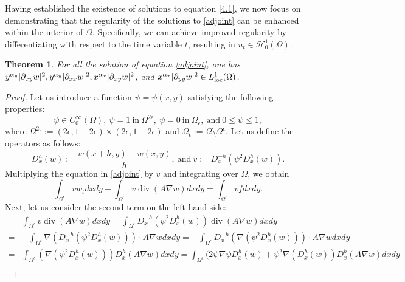 \documentclass[9pt,reqno]{amsart}
\newtheorem{theorem}{Theorem}
\theoremstyle{plain}
\numberwithin{equation}{section}
\numberwithin{theorem}{section}
\def\Om{\Omega}
\DeclareMathOperator*{\Div}{\mathrm{div}}
\def\Om{\Omega}
\begin{document}
	Having established the existence of solutions to equation \eqref{4.1}, we now focus on demonstrating that the regularity of the solutions to \eqref{adjoint} can be enhanced within the interior of $\Omega$. Specifically, we can achieve improved regularity by differentiating with respect to the time variable $t$, resulting in $u_t \in \mathcal{H}_0^1(\Omega)$.
	\begin{theorem}\label{regularity}
		For all the solution of equation \eqref{adjoint}, one has $y^{\alpha_y}|\partial_{xy} w|^2, y^{\alpha_y}|\partial_{xx} w|^2,\\ x^{\alpha_x}|\partial_{xy} w|^2$, and $ x^{\alpha_x}|\partial_{yy} w|^2 \in L^1_{\rm loc}(\Om)$.
	\end{theorem}
	\begin{proof}
		Let us introduce a function $\psi = \psi(x,y)$ satisfying the following properties:
		\begin{equation*}
			\psi \in C_0^\infty (\Om), \ \psi =1 \ \mbox{in} \ \Om^{2\epsilon}, \ \psi =0 \ \mbox{in} \ \Om_{\epsilon}, \ \mbox{and} \ 0\le \psi \le 1,
		\end{equation*}
		where $\Omega^{2\epsilon} := (2\epsilon, 1-2\epsilon) \times (2\epsilon, 1-2\epsilon)$ and $\Omega_{\epsilon} := \Omega \setminus \Omega^{\epsilon}$.
		Let us define the operators as follows:
		\begin{equation*}
			D_x^h (w):= \frac{w(x+h,y)-w(x,y)}{h}, \ \mbox{and} \ v:= D_x^{-h}(\psi^2 D_x^h (w)).
		\end{equation*}
		Multiplying the equation in \eqref{adjoint} by $v$ and integrating over $\Omega$, we obtain
		\begin{equation*}
			\int_{\Om^{\epsilon}} v w_t dxdy + \int_{\Om^{\epsilon}} v \Div(A\nabla w) dxdy =\int_{\Om^{\epsilon}} v f dxdy.
		\end{equation*}
		Next, let us consider the second term on the left-hand side:
		\begin{equation*}
			\begin{split}
				&\int_{\Om^{\epsilon}} v \Div(A\nabla w) dxdy=\int_{\Om^{\epsilon}} D_x^{-h}(\psi^2 D_x^h (w)) \Div(A\nabla w) dxdy\\
				=& -\int_{\Om^{\epsilon}} \nabla (D_x^{-h}(\psi^2 D_x^h (w))) \cdot A\nabla w dxdy
				= -\int_{\Om^{\epsilon}} D_x^{-h} (\nabla(\psi^2 D_x^h (w))) \cdot A\nabla w dxdy\\
				=&\int_{\Om^{\epsilon}}  (\nabla(\psi^2 D_x^h (w)))  D_x^{h}(A\nabla w) dxdy
				=\int_{\Om^{\epsilon}}  (2\psi \nabla \psi D_x^h (w)+ \psi^2 \nabla (D_x^h (w)) D_x^{h}(A\nabla w) dxdy\\

\end{split}
\end{equation*}
\end{proof}
\end{document}
